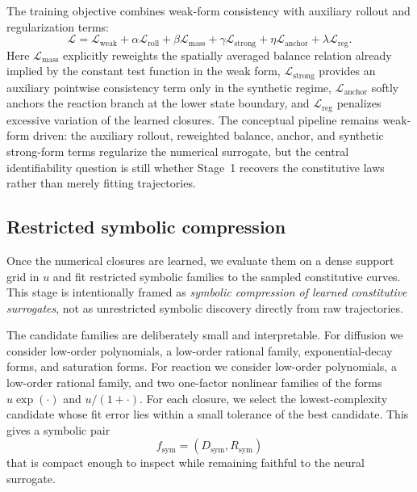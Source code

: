 \documentclass[preprint,12pt]{elsarticle}
\begin{document}
The training objective combines weak-form consistency with auxiliary rollout and regularization terms:
\begin{equation}
\mathcal{L}
= \mathcal{L}_{\text{weak}}
+ \alpha \mathcal{L}_{\text{roll}}
+ \beta \mathcal{L}_{\text{mass}}
+ \gamma \mathcal{L}_{\text{strong}}
+ \eta \mathcal{L}_{\text{anchor}}
+ \lambda \mathcal{L}_{\text{reg}}.
\end{equation}
Here $\mathcal{L}_{\text{mass}}$ explicitly reweights the spatially averaged balance relation already implied by the constant test function in the weak form, $\mathcal{L}_{\text{strong}}$ provides an auxiliary pointwise consistency term only in the synthetic regime, $\mathcal{L}_{\text{anchor}}$ softly anchors the reaction branch at the lower state boundary, and $\mathcal{L}_{\text{reg}}$ penalizes excessive variation of the learned closures. The conceptual pipeline remains weak-form driven: the auxiliary rollout, reweighted balance, anchor, and synthetic strong-form terms regularize the numerical surrogate, but the central identifiability question is still whether Stage~1 recovers the constitutive laws rather than merely fitting trajectories.

\subsection{Restricted symbolic compression}

Once the numerical closures are learned, we evaluate them on a dense support grid in $u$ and fit restricted symbolic families to the sampled constitutive curves. This stage is intentionally framed as \emph{symbolic compression of learned constitutive surrogates}, not as unrestricted symbolic discovery directly from raw trajectories.

The candidate families are deliberately small and interpretable. For diffusion we consider low-order polynomials, a low-order rational family, exponential-decay forms, and saturation forms. For reaction we consider low-order polynomials, a low-order rational family, and two one-factor nonlinear families of the forms $u\exp(\cdot)$ and $u/(1+\cdot)$. For each closure, we select the lowest-complexity candidate whose fit error lies within a small tolerance of the best candidate. This gives a symbolic pair
\begin{equation}
f_{\text{sym}} = \left( D_{\text{sym}}, R_{\text{sym}} \right)
\end{equation}
that is compact enough to inspect while remaining faithful to the neural surrogate.
\end{document}
